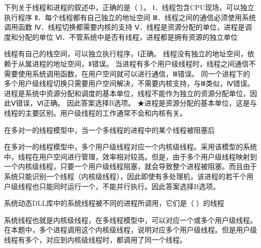\question 下列关于线程和进程的叙述中，正确的是（ ）。
Ⅰ．线程包含CPU现场，可以独立执行程序 Ⅱ．每个线程都有自己独立的地址空间
Ⅲ．线程之间的通信必须使用系统调用函数 Ⅳ．线程切换都需要内核的支持
Ⅴ．线程是资源分配的单位，进程是调度和分配的单位
Ⅵ．不管系统中是否有线程，进程都是拥有资源的独立单位
\par{}
\begin{solution}线程有自己的栈空间，可以独立执行程序，Ⅰ正确。
线程没有独立的地址空间，依赖于从属进程的地址空间，Ⅱ错误。
当进程有多个用户级线程时，线程之间通信不需要使用系统调用函数，在用户空间就可以进行通信，Ⅲ错误。
同一个进程下的多个用户级线程切换只需要用户空间解决，不需要内核支持，与Ⅲ类似，Ⅳ错误。
进程是系统中资源分配和调度的基本单位，线程不能作为独立的资源分配单位，因此Ⅴ错误，Ⅵ正确。
因此答案选择B选项。
★进程是资源分配的基本单位，这是与线程的主要区别。用户级线程的工作通常不会和内核有关。
\end{solution}
\question 在多对一的线程模型中，当一个多线程的进程中的某个线程被阻塞后
\par{}
\begin{solution}在多对一的线程模型中，多个用户级线程对应一个内核级线程。采用该模型的系统中，线程在用户空间进行管理，效率相对较高。但是，由于多个用户级线程映射到一个内核级线程，只要一个用户级线程阻塞，就会导致整个进程被阻塞。而且由于系统只能识别一个线程（内核级线程），因此即使有多处理机，该进程的若干个用户级线程也只能同时运行一个，不能并行执行。因此答案选择B选项。
\end{solution}
\question 系统动态DLL库中的系统线程被不同的进程所调用，它们是（ ）的线程
\par{}
\begin{solution}系统线程也就是内核级线程，在多线程模型中，可以对应一个或多个用户级线程。在本题中，多个进程调用这个内核级线程，说明对应多个用户级线程。但是用户级线程有多个，对应到内核级线程时，都调用了同一个线程。
\end{solution}
